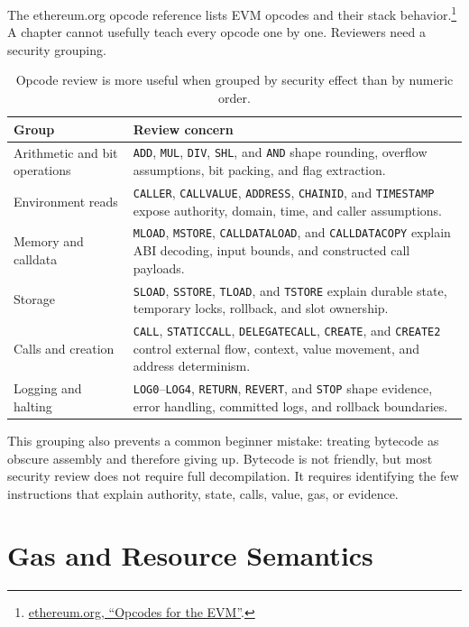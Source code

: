 The ethereum.org opcode reference lists EVM opcodes and their stack behavior.\footnote{\href{https://ethereum.org/developers/docs/evm/opcodes/}{ethereum.org, ``Opcodes for the EVM''}.} A chapter cannot usefully teach every opcode one by one. Reviewers need a security grouping.

\begin{table}[htbp]
\centering
\small
\renewcommand{\arraystretch}{1.18}
\begin{tabularx}{\textwidth}{@{}>{\RaggedRight\arraybackslash}p{}X@{}}
\toprule
Group & Review concern \\
\midrule
Arithmetic and bit operations & \texttt{ADD}, \texttt{MUL}, \texttt{DIV}, \texttt{SHL}, and \texttt{AND} shape rounding, overflow assumptions, bit packing, and flag extraction. \\
Environment reads & \texttt{CALLER}, \texttt{CALLVALUE}, \texttt{ADDRESS}, \texttt{CHAINID}, and \texttt{TIMESTAMP} expose authority, domain, time, and caller assumptions. \\
Memory and calldata & \texttt{MLOAD}, \texttt{MSTORE}, \texttt{CALLDATALOAD}, and \texttt{CALLDATACOPY} explain ABI decoding, input bounds, and constructed call payloads. \\
Storage & \texttt{SLOAD}, \texttt{SSTORE}, \texttt{TLOAD}, and \texttt{TSTORE} explain durable state, temporary locks, rollback, and slot ownership. \\
Calls and creation & \texttt{CALL}, \texttt{STATICCALL}, \texttt{DELEGATECALL}, \texttt{CREATE}, and \texttt{CREATE2} control external flow, context, value movement, and address determinism. \\
Logging and halting & \texttt{LOG0}--\texttt{LOG4}, \texttt{RETURN}, \texttt{REVERT}, and \texttt{STOP} shape evidence, error handling, committed logs, and rollback boundaries. \\
\bottomrule
\end{tabularx}
\caption{Opcode review is more useful when grouped by security effect than by numeric order.}
\end{table}

This grouping also prevents a common beginner mistake: treating bytecode as obscure assembly and therefore giving up. Bytecode is not friendly, but most security review does not require full decompilation. It requires identifying the few instructions that explain authority, state, calls, value, gas, or evidence.

\section{Gas and Resource Semantics}


